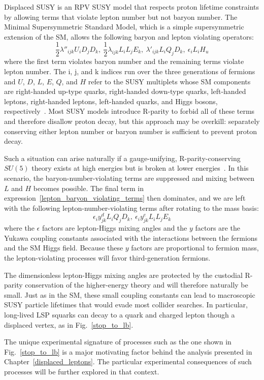 Displaced SUSY is an RPV SUSY model that respects proton lifetime constraints by allowing terms that violate lepton number but not baryon number. The Minimal Supersymmetric Standard Model, which is a simple supersymmetric extension of the SM, allows the following baryon and lepton violating operators:
\begin{equation}
    \label{lepton_baryon_violating_terms}
    \frac{1}{2}\lambda''_{ijk}U_{i}D_{j}D_{k},\ \frac{1}{2}\lambda_{ijk}L_{i}L_{j}E_{k},\  \lambda'_{ijk}L_{i}Q_{j}D_{k},\  \epsilon_{i}L_{i}H_{u} 
\end{equation}
where the first term violates baryon number and the remaining terms violate lepton number. The i, j, and k indices run over the three generations of fermions and $U$, $D$, $L$, $E$, $Q$, and $H$ refer to the SUSY multiplets whose SM components are right-handed up-type quarks, right-handed down-type quarks, left-handed leptons, right-handed leptons, left-handed quarks, and Higgs bosons, respectively~\cite{susy_primer}. Most SUSY models introduce R-parity to forbid all of these terms and therefore disallow proton decay, but this approach may be overkill: separately conserving either lepton number or baryon number is sufficient to prevent proton decay.

Such a situation can arise naturally if a gauge-unifying, R-parity-conserving $SU(5)$ theory exists at high energies but is broken at lower energies~\cite{hall_suzuki_rpv}. In this scenario, the baryon-number-violating terms are suppressed and mixing between $L$ and $H$ becomes possible. The final term in expression~\eqref{lepton_baryon_violating_terms} then dominates, and we are left with the following lepton-number-violating terms after rotating to the mass basis:
\begin{equation}
    \label{displaced_susy_terms}
    \epsilon_{i}y^{d}_{jk}L_{i}Q_{j}D_{k},\ \epsilon_{i}y^{e}_{jk}L_{i}L_{j}E_{k} 
\end{equation}
where the $\epsilon$ factors are lepton-Higgs mixing angles and the $y$ factors are the Yukawa coupling constants associated with the interactions between the fermions and the SM Higgs field. Because these $y$ factors are proportional to fermion mass, the lepton-violating processes will favor third-generation fermions.

The dimensionless lepton-Higgs mixing angles are protected by the custodial R-parity conservation of the higher-energy theory and will therefore naturally be small. Just as in the SM, these small coupling constants can lead to macroscopic SUSY particle lifetimes that would evade most collider searches. In particular, long-lived LSP squarks can decay to a quark and charged lepton though a displaced vertex, as in Fig.~\ref{stop_to_lb}.



The unique experimental signature of processes such as the one shown in Fig.~\ref{stop_to_lb} is a major motivating factor behind the analysis presented in Chapter~\ref{displaced_leptons}. The particular experimental consequences of such processes will be further explored in that context.

\pagebreak